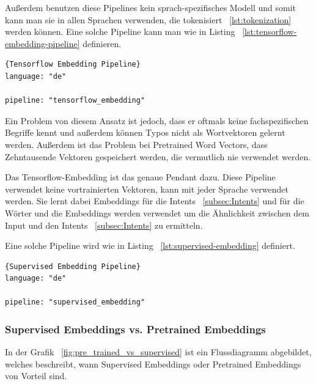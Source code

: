 Außerdem benutzen diese Pipelines kein sprach-spezifisches Modell und somit kann man sie in allen Sprachen verwenden, die tokenisiert ~\ref{lst:tokenization} werden können.
Eine solche Pipeline kann man wie in Listing ~\ref{lst:tensorflow-embedding-pipeline} definieren.\cite{tensorFlowEmbedding}

\begin{lstlisting}[label={lst:tensorflow-embedding-pipeline},caption={Tensorflow Embedding Pipeline}]{Tensorflow Embedding Pipeline}
language: "de"

pipeline: "tensorflow_embedding"
\end{lstlisting}

Ein Problem von diesem Ansatz ist jedoch, dass er oftmals keine fachspezifischen Begriffe kennt und außerdem können Typos nicht als Wortvektoren gelernt werden.
Außerdem ist das Problem bei Pretrained Word Vectors, dass Zehntausende Vektoren gespeichert werden, die vermutlich nie verwendet werden.\cite{tensorFlowEmbedding, choosingPipeline}

Das Tensorflow-Embedding ist das genaue Pendant dazu.
Diese Pipeline verwendet keine vortrainierten Vektoren, kann mit jeder Sprache verwendet werden.
Sie lernt dabei Embeddings für die Intents ~\ref{subsec:Intents} und für die Wörter und die Embeddings werden verwendet um die Ähnlichkeit zwischen dem Input und den Intents ~\ref{subsec:Intents} zu ermitteln.\cite{tensorFlowEmbedding, choosingPipeline}

Eine solche Pipeline wird wie in Listing ~\ref{lst:supervised-embedding} definiert.

\begin{lstlisting}[label={lst:supervised-embedding},caption={Supervised Embedding Pipeline}]{Supervised Embedding Pipeline}
language: "de"

pipeline: "supervised_embedding"
\end{lstlisting}

\subsubsection{Supervised Embeddings vs. Pretrained Embeddings}\label{subsubsec:supervised-embedding-vs-pretrained-embedding}

In der Grafik ~\ref{fig:pre_trained_vs_supervised} ist ein Flussdiagramm abgebildet, welches beschreibt, wann Supervised Embeddings oder Pretrained Embeddings von Vorteil sind.

